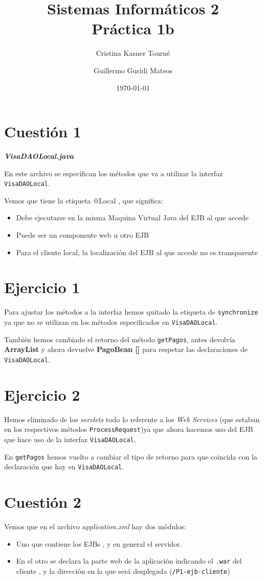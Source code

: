 \documentclass[a4paper, 10pt]{article}
\title{Sistemas Informáticos 2\\Práctica 1b}
\author{Cristina Kasner Tourné\and Guillermo Guridi Mateos}
\date{\today}
\begin{document}
\maketitle
\newpage

\section{Cuestión 1}\textit{\textbf{VisaDAOLocal.java}}


En este archivo se especifican los métodos que va a utilizar la interfaz \texttt{VisaDAOLocal}.


Vemos que tiene la etiqueta @Local , que significa:
\begin{itemize}
	\item Debe ejecutarse en la misma Maquina Virtual Java del EJB al que accede
	\item Puede ser un componente web u otro EJB
	\item Para el cliente local, la localización del EJB al que accede no es transparente
\end{itemize}

\section{Ejercicio 1}

Para ajustar los métodos a la interfaz hemos quitado la etiqueta de \texttt{synchronize} ya que no se utilizan en los métodos especificados en \texttt{VisaDAOLocal}.

También hemos cambiado el retorno del método \texttt{getPagos}, antes devolvía \textbf{ArrayList} y ahora devuelve \textbf{PagoBean []} para respetar las declaraciones de \texttt{VisaDAOLocal}.

\section{Ejercicio 2}
Hemos eliminado de los \textit{servlets} todo lo referente a los \textit{Web Services} (que estaban en los respectivos métodos \texttt{ProcessRequest})ya que ahora hacemos uso del EJB que hace uso de la interfaz \texttt{VisaDAOLocal}.

En \texttt{getPagos} hemos vuelto a cambiar el tipo de retorno para que coincida con la declaración que hay en \texttt{VisaDAOLocal}.
\section{Cuestión 2}
Vemos que en el archivo \textit{application.xml} hay dos módulos:
\begin{itemize}
	\item Uno que contiene los EJBs , y en general el servidor.
	\item En el otro se declara la parte web de la aplicación indicando el \texttt{.war} del cliente , y la dirección en la que será desplegada (\texttt{/P1-ejb-cliente})
 \end{itemize}
 
\end{document}
